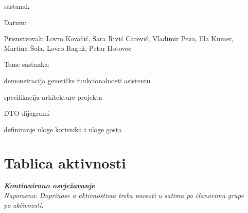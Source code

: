 \begin{packed_enum}
			\item  sastanak
			\item[] \begin{packed_item}
				\item Datum: 
				\item Prisustvovali: Lovro Kovačić, Sara Rivić Carević, Vladimir Pezo, Ela Kumer, Martina Šola, Lovro Raguž, Petar Hotovec
				\item Teme sastanka:
				\begin{packed_item}
				    \item  demonstracija generičke funkcionalnosti asistentu
				    \item  specifikacija arhitekture projekta
				    \item  DTO dijagrami
				    \item  definiranje uloge korisnika i uloge gosta
				\end{packed_item}
			\end{packed_item}
			
		\end{packed_enum}
		
		\eject
		\section*{Tablica aktivnosti}
		
			\textbf{\textit{Kontinuirano osvježavanje}}\\
			
			 \textit{Napomena: Doprinose u aktivnostima treba navesti u satima po članovima grupe po aktivnosti.}

